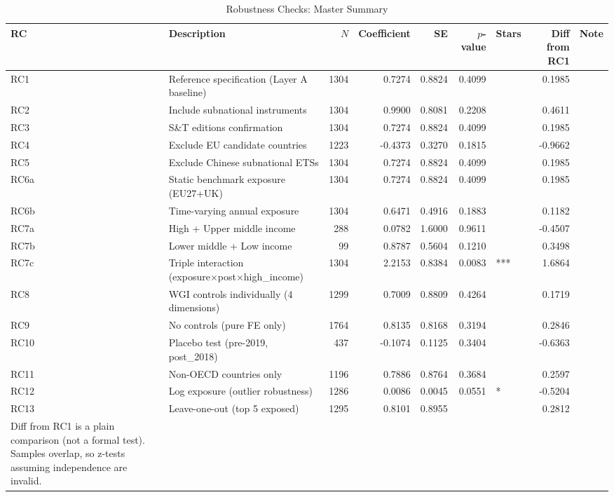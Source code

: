 \documentclass[12pt,a4paper]{article}
\begin{document}
\begin{landscape}
\begin{table}[htbp]
\centering
\begin{threeparttable}
\caption{Robustness Checks: Master Summary}\label{tab:robustness}
\small
\begin{tabular}{llrrrrlrl}
\toprule
RC & Description & $N$ & Coefficient & SE & $p$-value & Stars & Diff from RC1 & Note \\
\midrule
RC1 & Reference specification (Layer A baseline) & 1304 & 0.7274 & 0.8824 & 0.4099 &  & 0.1985 &  \\
RC2 & Include subnational instruments & 1304 & 0.9900 & 0.8081 & 0.2208 &  & 0.4611 &  \\
RC3 & S\&T editions confirmation & 1304 & 0.7274 & 0.8824 & 0.4099 &  & 0.1985 &  \\
RC4 & Exclude EU candidate countries & 1223 & -0.4373 & 0.3270 & 0.1815 &  & -0.9662 &  \\
RC5 & Exclude Chinese subnational ETSs & 1304 & 0.7274 & 0.8824 & 0.4099 &  & 0.1985 &  \\
RC6a & Static benchmark exposure (EU27+UK) & 1304 & 0.7274 & 0.8824 & 0.4099 &  & 0.1985 &  \\
RC6b & Time-varying annual exposure & 1304 & 0.6471 & 0.4916 & 0.1883 &  & 0.1182 &  \\
RC7a & High + Upper middle income & 288 & 0.0782 & 1.6000 & 0.9611 &  & -0.4507 &  \\
RC7b & Lower middle + Low income & 99 & 0.8787 & 0.5604 & 0.1210 &  & 0.3498 &  \\
RC7c & Triple interaction (exposure×post×high\_income) & 1304 & 2.2153 & 0.8384 & 0.0083 & *** & 1.6864 &  \\
RC8 & WGI controls individually (4 dimensions) & 1299 & 0.7009 & 0.8809 & 0.4264 &  & 0.1719 &  \\
RC9 & No controls (pure FE only) & 1764 & 0.8135 & 0.8168 & 0.3194 &  & 0.2846 &  \\
RC10 & Placebo test (pre-2019, post\_2018) & 437 & -0.1074 & 0.1125 & 0.3404 &  & -0.6363 &  \\
RC11 & Non-OECD countries only & 1196 & 0.7886 & 0.8764 & 0.3684 &  & 0.2597 &  \\
RC12 & Log exposure (outlier robustness) & 1286 & 0.0086 & 0.0045 & 0.0551 & * & -0.5204 &  \\
RC13 & Leave-one-out (top 5 exposed) & 1295 & 0.8101 & 0.8955 &  &  & 0.2812 &  \\
Diff from RC1 is a plain comparison (not a formal test). Samples overlap, so z-tests assuming independence are invalid. &  &  &  &  &  &  &  &  \\

\end{tabular}
\end{threeparttable}
\end{table}
\end{landscape}
\end{document}
